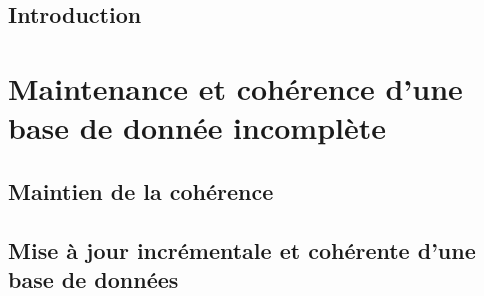 \pagestyle{fancy}


\frontmatter




\dominitoc
\tableofcontents
{}
\listoffigures
{}
\listoftables

\mainmatter

\chapter{Introduction}
\minitoc



\part{Maintenance et cohérence d'une base de donnée incomplète}
\label{part:update}
\glsresetall


\chapter{Maintien de la cohérence}
\label{chp:update:intro}
\minitoc


\chapter{Mise à jour incrémentale et cohérente d'une base de données}
\label{chp:update:algos}
\minitoc




